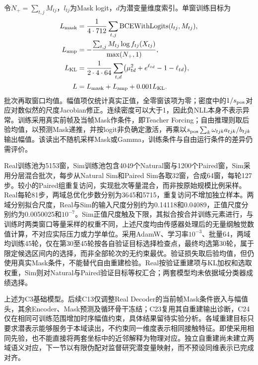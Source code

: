 令$N_+=\sum_{t,j}M_{tj}$，$l_{tj}$为Mask logit，$d$为潜变量维度索引。单窗训练目标为
\begin{equation}
 \begin{aligned}
 L_{\rm mask}&=\frac1{4\cdot712}\sum_{t,j}
 \operatorname{BCEWithLogits}(l_{tj},M_{tj}),\\
 L_{\rm amp}&=-\frac{\sum_{t,j}M_{tj}\log f_{tj}(X_{tj})}{\max(N_+,1)},\\
 L_{\rm KL}&=\frac1{2\cdot4\cdot64}\sum_{t,d}
 \bigl(\mu_{td}^{2}+e^{\ell_{td}}-1-\ell_{td}\bigr),\\
 L&=L_{\rm mask}+L_{\rm amp}+0.001L_{\rm KL}.
 \end{aligned}
 \label{eq:ch05_vae_objective}
\end{equation}
批次再取窗口均值。幅值项仅统计真实正值，全零窗该项为零；密度中的$1/s_{\rm pos}$对应对数似然的尺度Jacobian修正。连续密度可以大于1，因此负NLL本身不表示异常。训练采用真实前帧及当帧Mask作条件，即Teacher Forcing；自由推理则取后验均值，以预测Mask递推，并按logit非负确定激活，再乘以$s_{\rm pos}\sum_k\omega_{tjk}a_{tjk}/b_{tjk}$输出幅值。该读出不随机采样Mask或Gamma，训练条件与自由运行条件的差异仍需评价。

Real训练池为5153窗，Sim训练池包含4049个Natural窗与1200个Paired窗，Sim采用分层混合批次，每步从Natural Sim和Paired Sim各取32窗，合成64窗，每轮127步。较小的Paired组重复访问，实现批次等量混合，而非按原始规模比例采样。Real每轮81步，两域总优化步数分别为3645和5715，重复访问不增加独立样本。两域分别拟合尺度，Real与Sim的输入尺度分别约为0.14118和0.04089，正值尺度分别约为0.0050025和$10^{-7}$。Sim正值尺度触及下限，其拟合按合并训练元素进行，与训练时两类窗口等量采样的权重不同，上述尺度均由传感器处理后的无量纲触觉数值计算，不对应实际压力或力学单位。采用AdamW、学习率$10^{-3}$、批量64，两域均训练45轮，仅在第30至45轮按各自验证目标选择检查点，最终均选第30轮，属于限定候选区间内的选择，而非全部轮次的无约束最优。验证损失取后验均值，但仍使用真实Mask条件，不能替代自由重建检验。Real按验证重建项与KL加权和选取权重，Sim则对Natural与Paired验证目标等权汇合；两套模型均未依据域分类器成绩选择。

上述为C3基础模型。后续C13仅调整Real Decoder的当前帧Mask条件嵌入与幅值头，其余Encoder、Mask预测及循环骨干冻结；C23复用其自重建输出诊断，C24仅在相同可训练范围增加时序幅值约束，具体结果留待实验分析。各域重建目标只要求潜表示能够服务于本域读出，不约束同一维度表示相同接触特征。即使采用相同先验，也不能直接将两套坐标中的近邻解释为物理对应。独立自重建尚未建立两域语义对应，下一节以有限伪配对监督研究潜变量映射，而不预设同维表示已完成对齐。



